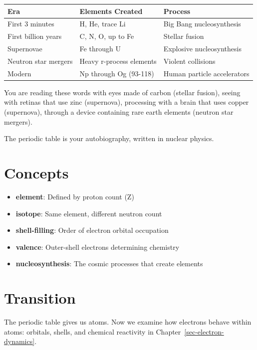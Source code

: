\documentclass[
  11pt,
  letterpaper,
  twoside,
  openright]{book}
\providecommand{\tightlist}{%
  \setlength{\itemsep}{0pt}\setlength{\parskip}{0pt}}
\begin{document}
\begin{longtable}[]{@{}lll@{}}
\toprule\noalign{}
Era & Elements Created & Process \\
\midrule\noalign{}
\endhead
\bottomrule\noalign{}
\endlastfoot
First 3 minutes & H, He, trace Li & Big Bang nucleosynthesis \\
First billion years & C, N, O, up to Fe & Stellar fusion \\
Supernovae & Fe through U & Explosive nucleosynthesis \\
Neutron star mergers & Heavy r-process elements & Violent collisions \\
Modern & Np through Og (93-118) & Human particle accelerators \\
\end{longtable}

You are reading these words with eyes made of carbon (stellar fusion),
seeing with retinas that use zinc (supernova), processing with a brain
that uses copper (supernova), through a device containing rare earth
elements (neutron star mergers).

The periodic table is your autobiography, written in nuclear physics.

\section{Concepts}\label{concepts-1}

\begin{itemize}
\tightlist
\item
  \textbf{element}: Defined by proton count (Z)
\item
  \textbf{isotope}: Same element, different neutron count
\item
  \textbf{shell-filling}: Order of electron orbital occupation
\item
  \textbf{valence}: Outer-shell electrons determining chemistry
\item
  \textbf{nucleosynthesis}: The cosmic processes that create elements
\end{itemize}

\section{Transition}\label{transition-1}

The periodic table gives us atoms. Now we examine how electrons behave
within atoms: orbitals, shells, and chemical reactivity in
Chapter~\ref{sec-electron-dynamics}.
\end{document}
